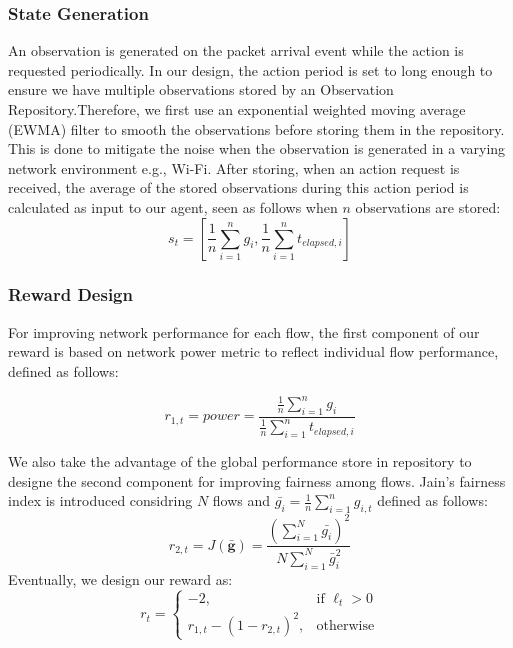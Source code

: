 \documentclass[journal]{IEEEtran}
\begin{document}
\subsubsection{State Generation}
An observation is generated on the packet arrival event while the action is requested periodically. In our design, the action period is set to long enough to ensure we have multiple observations stored by an Observation Repository.Therefore, we first use an exponential weighted moving average (EWMA) filter to smooth the observations before storing them in the repository. This is done to mitigate the noise when the observation is generated in a varying network environment e.g., Wi-Fi. After storing, when an action request is received, the average of the stored observations during this action period is calculated as input to our agent, seen as follows when $n$ observations are stored:
\begin{equation}
  s_t = \left[  \frac{1}{n}\sum_{i=1}^{n}g_i, \frac{1}{n}\sum_{i=1}^{n}t_{elapsed,i} \right]
\end{equation}

\subsubsection{Reward Design}
For improving network performance for each flow, the first component of our reward is based on network power metric to reflect individual flow performance, defined as follows:

$$ r_{1,t} = power = \frac{\frac{1}{n}\sum_{i=1}^{n}g_i}{\frac{1}{n}\sum_{i=1}^{n}t_{elapsed,i}}$$

We also take the advantage of the global performance store in repository to designe the second component for improving fairness among flows. Jain's fairness index is introduced considring $N$ flows and $\bar{g_i} = \frac{1}{n} \sum_{i = 1}^{n} g_{i,t}$ defined as follows:
$$r_{2,t} = J (\mathbf{\bar{g}}) = 
\frac{\left(\sum_{i=1}^{N} \bar{g_i} \right)^2}
{N \sum_{i=1}^{N}\bar{g}_{i}^2}$$
Eventually, we design our reward as:
\begin{equation}
r_t =
\begin{cases}
-2, & \text{if } \ell_t > 0 \\
r_{1,t} - (1 - r_{2,t})^2, & \text{otherwise}
\end{cases}
\end{equation}
\end{document}
